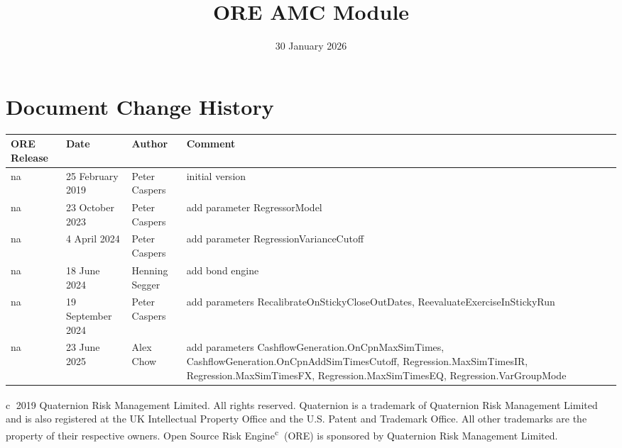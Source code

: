 \documentclass[12pt, a4paper]{article}
\begin{document}
\title{ORE AMC Module}
\date{30 January 2026}
\maketitle

\newpage

\section*{Document Change History}

\begin{center}
\begin{supertabular}{|l|l|l|p{7cm}|}
\hline
ORE Release & Date & Author & Comment \\
\hline
na & 25 February 2019  & Peter Caspers & initial version\\
na & 23 October 2023 & Peter Caspers & add parameter RegressorModel\\
na & 4 April 2024 & Peter Caspers & add parameter RegressionVarianceCutoff\\
na & 18 June 2024 & Henning Segger & add bond engine\\
na & 19 September 2024 & Peter Caspers & add parameters RecalibrateOnStickyCloseOutDates, ReevaluateExerciseInStickyRun\\
na & 23 June 2025 & Alex Chow & add parameters CashflowGeneration.OnCpnMaxSimTimes,
  CashflowGeneration.OnCpnAddSimTimesCutoff, Regression.MaxSimTimesIR, Regression.MaxSimTimesFX,
  Regression.MaxSimTimesEQ, Regression.VarGroupMode\\
\hline
\end{supertabular}
\end{center}

\vspace{3cm}

\newpage

\tableofcontents
\vfill

\textcircled{c} 2019 Quaternion Risk Management Limited.  All rights reserved.
Quaternion\textsuperscript{\textregistered} is a trademark of Quaternion Risk Management Limited and is also registered
at the UK Intellectual Property Office and the U.S. Patent and Trademark Office.  All other trademarks are the property
of their respective owners. Open Source Risk Engine\textsuperscript{\textcircled{c}} (ORE) is sponsored by Quaternion
Risk Management Limited.
\end{document}
